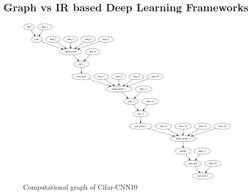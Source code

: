 


\subsection{Graph vs IR based Deep Learning Frameworks}

\begin{figure}[th]
\centering
\includegraphics[scale=0.3]{Figures/cnn_smv_dataflow_graph.png}
\decoRule
\caption[cnn]{Computational graph of Cifar-CNN10}
\label{fig:comp_graph_cnn}
\end{figure}

